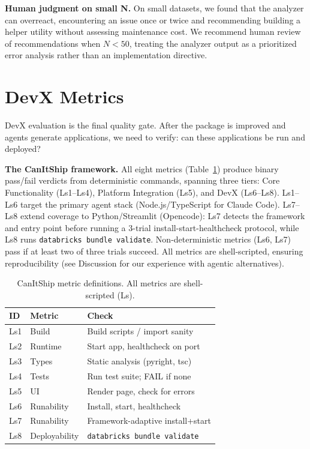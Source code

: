 \documentclass[sigconf,review]{acmart}
\begin{document}
\textbf{Human judgment on small N.} On small datasets, we found that the analyzer can overreact, encountering an issue once or twice and recommending building a helper utility without assessing maintenance cost. We recommend human review of recommendations when $N < 50$, treating the analyzer output as a prioritized error analysis rather than an implementation directive.

\section{DevX Metrics}
\label{sec:devx}

DevX evaluation is the final quality gate. After the package is improved and agents generate applications, we need to verify: can these applications be run and deployed?

\textbf{The CanItShip framework.} All eight metrics (Table~\ref{tab:prompts}) produce binary pass/fail verdicts from deterministic commands, spanning three tiers: Core Functionality (Ls1--Ls4), Platform Integration (Ls5), and DevX (Ls6--Ls8). Ls1--Ls6 target the primary agent stack (Node.js/TypeScript for Claude Code). Ls7--Ls8 extend coverage to Python/Streamlit (Opencode): Ls7 detects the framework and entry point before running a 3-trial install-start-healthcheck protocol, while Ls8 runs \texttt{databricks bundle validate}. Non-deterministic metrics (Ls6, Ls7) pass if at least two of three trials succeed. All metrics are shell-scripted, ensuring reproducibility (see Discussion for our experience with agentic alternatives).

\begin{table}[h]
\caption{CanItShip metric definitions. All metrics are shell-scripted (Ls).}
\label{tab:prompts}
\centering
\small
\begin{tabular}{lll}
\toprule
\textbf{ID} & \textbf{Metric} & \textbf{Check} \\
\midrule
Ls1 & Build & Build scripts / import sanity \\
Ls2 & Runtime & Start app, healthcheck on port \\
Ls3 & Types & Static analysis (pyright, tsc) \\
Ls4 & Tests & Run test suite; FAIL if none \\
Ls5 & UI & Render page, check for errors \\
Ls6 & Runability & Install, start, healthcheck \\
\midrule
Ls7 & Runability & Framework-adaptive install+start \\
Ls8 & Deployability & \texttt{databricks bundle validate} \\
\bottomrule
\end{tabular}
\end{table}
\end{document}
